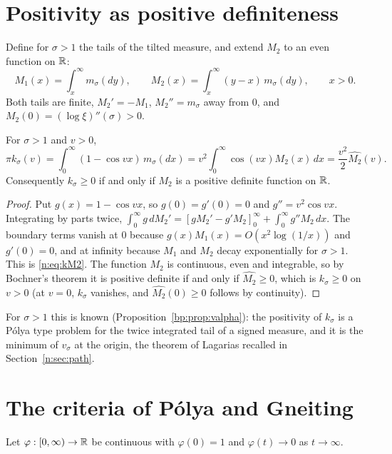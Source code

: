 \section{Positivity as positive definiteness}\label{n:sec:bochner}

Define for $\sigma>1$ the tails of the tilted measure, and extend $M_2$ to an even function on $\mathbb{R}$:
\[
M_1(x)=\int_x^\infty m_\sigma(dy),\qquad M_2(x)=\int_x^\infty(y-x)\,m_\sigma(dy),\qquad x>0 .
\]
Both tails are finite, $M_2'=-M_1$, $M_2''=m_\sigma$ away from $0$, and $M_2(0)=(\log\xi)''(\sigma)>0$.

\begin{theorem}[proved]\label{n:thm:bochner}
For $\sigma>1$ and $v>0$,
\begin{equation}\label{n:eq:kM2}
\pi k_\sigma(v)=\int_0^\infty(1-\cos vx)\,m_\sigma(dx)=v^2\int_0^\infty\cos(vx)M_2(x)\,dx=\frac{v^2}{2}\widehat{M_2}(v).
\end{equation}
Consequently $k_\sigma\ge0$ if and only if $M_2$ is a positive definite function on $\mathbb{R}$.
\end{theorem}

\begin{proof}
Put $g(x)=1-\cos vx$, so $g(0)=g'(0)=0$ and $g''=v^2\cos vx$. Integrating by parts twice, $\int_0^\infty g\,dM_2'=[gM_2'-g'M_2]_0^\infty+\int_0^\infty g''M_2\,dx$. The boundary terms vanish at $0$ because $g(x)M_1(x)=O(x^2\log(1/x))$ and $g'(0)=0$, and at infinity because $M_1$ and $M_2$ decay exponentially for $\sigma>1$. This is \eqref{n:eq:kM2}. The function $M_2$ is continuous, even and integrable, so by Bochner's theorem it is positive definite if and only if $\widehat{M_2}\ge0$, which is $k_\sigma\ge0$ on $v>0$ (at $v=0$, $k_\sigma$ vanishes, and $\widehat{M_2}(0)\ge0$ follows by continuity).
\end{proof}

For $\sigma>1$ this is known (Proposition~\ref{bp:prop:valpha}): the positivity of $k_\sigma$ is a Pólya type problem for the twice integrated tail of a signed measure, and it is the minimum of $v_\sigma$ at the origin, the theorem of Lagarias \cite{Lagarias} recalled in Section~\ref{n:sec:path}.

\section{The criteria of Pólya and Gneiting}\label{n:sec:gneiting}

Let $\varphi:[0,\infty)\to\mathbb{R}$ be continuous with $\varphi(0)=1$ and $\varphi(t)\to0$ as $t\to\infty$.

